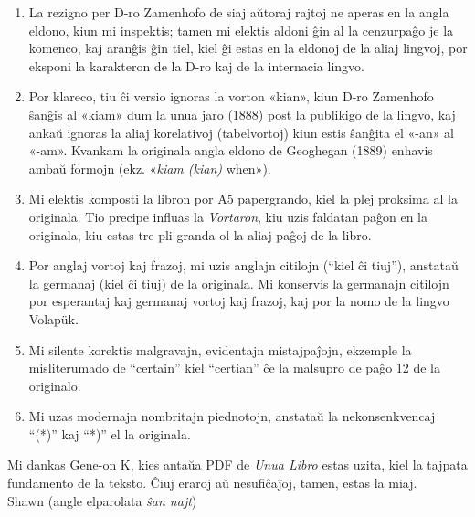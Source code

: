 \documentclass[12pt,twoside]{book}
\begin{document}
\begin{enumerate}

\item La rezigno per D-ro Zamenhofo de siaj aŭtoraj rajtoj ne aperas en la angla eldono, kiun mi inspektis; tamen mi elektis aldoni ĝin al la cenzurpaĝo je la komenco, kaj aranĝis ĝin tiel, kiel ĝi estas en la eldonoj de la aliaj lingvoj, por eksponi la karakteron de la D-ro kaj de la internacia lingvo.

\item Por klareco, tiu ĉi versio ignoras la vorton «kian», kiun D-ro Zamenhofo ŝanĝis al «kiam» dum la unua jaro (1888) post la publikigo de la lingvo, kaj ankaŭ ignoras la aliaj korelativoj (tabelvortoj) kiun estis ŝanĝita el «-an» al «-am». Kvankam la originala angla eldono de Geoghegan (1889) enhavis ambaŭ formojn (ekz. «\emph{kiam (kian)} when»).

\item Mi elektis komposti la libron por A5 papergrando, kiel la plej proksima al la originala.  Tio precipe influas la \emph{Vortaron}, kiu uzis faldatan paĝon en la originala, kiu estas tre pli granda ol la aliaj paĝoj de la libro.

\item Por anglaj vortoj kaj frazoj, mi uzis anglajn citilojn (``kiel ĉi tiuj''), anstataŭ la germanaj (\glqq{}kiel ĉi tiuj\grqq{}) de la originala.  Mi konservis la germanajn citilojn por esperantaj kaj germanaj vortoj kaj frazoj, kaj por la nomo de la lingvo Volap\"{u}k.

\item Mi silente korektis malgravajn, evidentajn mistajpaĵojn, ekzemple la misliterumado de ``certain'' kiel ``certian'' ĉe la malsupro de paĝo 12 de la originalo.

\item Mi uzas modernajn nombritajn piednotojn, anstataŭ la nekonsenkvencaj ``(*)'' kaj ``*)'' el la originala.

\end{enumerate}

Mi dankas Gene-on K, kies antaŭa PDF de \emph{Unua Libro} estas uzita, kiel la tajpata fundamento de la teksto.  Ĉiuj eraroj aŭ nesufiĉaĵoj, tamen, estas la miaj.\\[1ex]

{\setlength{\parindent}{0em}
Shawn  (angle elparolata \emph{ŝan najt})\\
\hodiau}


\end{document}
